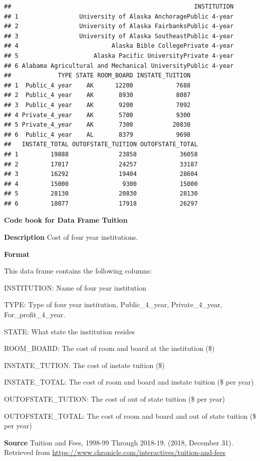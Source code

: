\documentclass[
]{book}
\begin{document}
\begin{verbatim}
##                                                   INSTITUTION
## 1                 University of Alaska AnchoragePublic 4-year
## 2                 University of Alaska FairbanksPublic 4-year
## 3                 University of Alaska SoutheastPublic 4-year
## 4                          Alaska Bible CollegePrivate 4-year
## 5                     Alaska Pacific UniversityPrivate 4-year
## 6 Alabama Agricultural and Mechanical UniversityPublic 4-year
##             TYPE STATE ROOM_BOARD INSTATE_TUITION
## 1  Public_4 year    AK      12200            7688
## 2  Public_4 year    AK       8930            8087
## 3  Public_4 year    AK       9200            7092
## 4 Private_4_year    AK       5700            9300
## 5 Private_4_year    AK       7300           20830
## 6  Public_4 year    AL       8379            9698
##   INSTATE_TOTAL OUTOFSTATE_TUITION OUTOFSTATE_TOTAL
## 1         19888              23858            36058
## 2         17017              24257            33187
## 3         16292              19404            28604
## 4         15000               9300            15000
## 5         28130              20830            28130
## 6         18077              17918            26297
\end{verbatim}

\textbf{Code book for Data Frame Tuition}

\textbf{Description}
Cost of four year institutions.

\textbf{Format}

This data frame contains the following columns:

INSTITUTION: Name of four year institution

TYPE: Type of four year institution, Public\_4\_year, Private\_4\_year, For\_profit\_4\_year.

STATE: What state the institution resides

ROOM\_BOARD: The cost of room and board at the institution (\$)

INSTATE\_TUTION: The cost of instate tuition (\$)

INSTATE\_TOTAL: The cost of room and board and instate tuition (\$ per year)

OUTOFSTATE\_TUTION: The cost of out of state tuition (\$ per year)

OUTOFSTATE\_TOTAL: The cost of room and board and out of state tuition (\$ per year)

\textbf{Source}
Tuition and Fees, 1998-99 Through 2018-19. (2018, December 31). Retrieved from \url{https://www.chronicle.com/interactives/tuition-and-fees}
\end{document}

